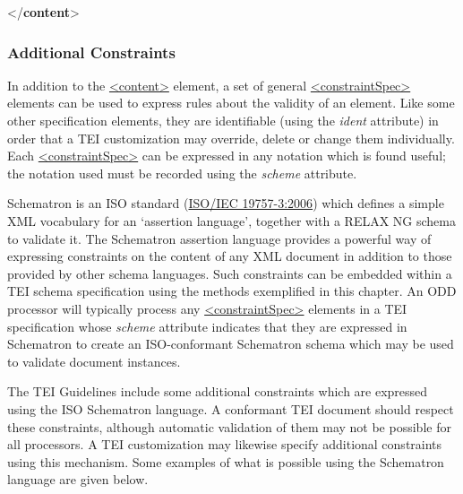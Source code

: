 \begin{shaded}
\hspace*{1em}\mbox{}\newline 
\hspace*{1em}\mbox{}\newline 
{}\mbox{}\newline 
{</\textbf{content}>}\end{shaded}\egroup\par 
\subsubsection[{Additional Constraints}]{Additional Constraints}\label{TDTAGCONS}\par
In addition to the \hyperref[TEI.content]{<content>} element, a set of general \hyperref[TEI.constraintSpec]{<constraintSpec>} elements can be used to express rules about the validity of an element. Like some other specification elements, they are identifiable (using the {\itshape ident} attribute) in order that a TEI customization may override, delete or change them individually. Each \hyperref[TEI.constraintSpec]{<constraintSpec>} can be expressed in any notation which is found useful; the notation used must be recorded using the {\itshape scheme} attribute.\par
Schematron is an ISO standard (\hyperref[ISO-19757-3]{ISO/IEC 19757-3:2006}) which defines a simple XML vocabulary for an ‘assertion language’, together with a RELAX NG schema to validate it. The Schematron assertion language provides a powerful way of expressing constraints on the content of any XML document in addition to those provided by other schema languages. Such constraints can be embedded within a TEI schema specification using the methods exemplified in this chapter. An ODD processor will typically process any \hyperref[TEI.constraintSpec]{<constraintSpec>} elements in a TEI specification whose {\itshape scheme} attribute indicates that they are expressed in Schematron to create an ISO-conformant Schematron schema which may be used to validate document instances.\par
The TEI Guidelines include some additional constraints which are expressed using the ISO Schematron language. A conformant TEI document should respect these constraints, although automatic validation of them may not be possible for all processors. A TEI customization may likewise specify additional constraints using this mechanism. Some examples of what is possible using the Schematron language are given below. \par
